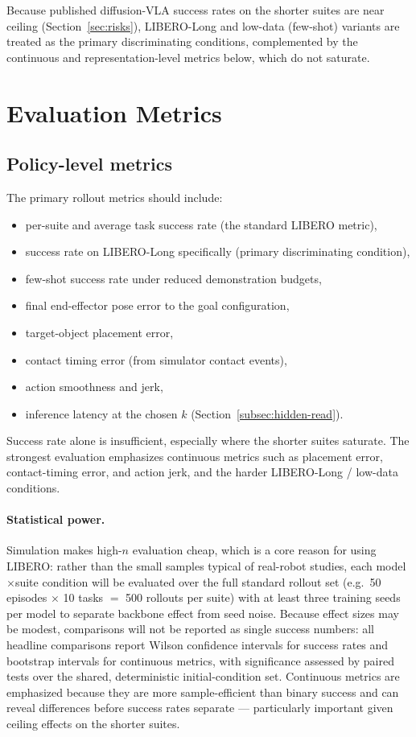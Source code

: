 \documentclass[11pt]{article}
\begin{document}
Because published diffusion-VLA success rates on the shorter suites are near ceiling (Section~\ref{sec:risks}), LIBERO-Long and low-data (few-shot) variants are treated as the primary discriminating conditions, complemented by the continuous and representation-level metrics below, which do not saturate.

\section{Evaluation Metrics}

\subsection{Policy-level metrics}

The primary rollout metrics should include:

\begin{itemize}
    \item per-suite and average task success rate (the standard LIBERO metric),
    \item success rate on LIBERO-Long specifically (primary discriminating condition),
    \item few-shot success rate under reduced demonstration budgets,
    \item final end-effector pose error to the goal configuration,
    \item target-object placement error,
    \item contact timing error (from simulator contact events),
    \item action smoothness and jerk,
    \item inference latency at the chosen $k$ (Section~\ref{subsec:hidden-read}).
\end{itemize}

Success rate alone is insufficient, especially where the shorter suites saturate. The strongest evaluation emphasizes continuous metrics such as placement error, contact-timing error, and action jerk, and the harder LIBERO-Long / low-data conditions.

\paragraph{Statistical power.} Simulation makes high-$n$ evaluation cheap, which is a core reason for using LIBERO: rather than the small samples typical of real-robot studies, each model$\times$suite condition will be evaluated over the full standard rollout set (e.g.\ 50 episodes $\times$ 10 tasks $=$ 500 rollouts per suite) with at least three training seeds per model to separate backbone effect from seed noise. Because effect sizes may be modest, comparisons will not be reported as single success numbers: all headline comparisons report Wilson confidence intervals for success rates and bootstrap intervals for continuous metrics, with significance assessed by paired tests over the shared, deterministic initial-condition set. Continuous metrics are emphasized because they are more sample-efficient than binary success and can reveal differences before success rates separate --- particularly important given ceiling effects on the shorter suites.
\end{document}
